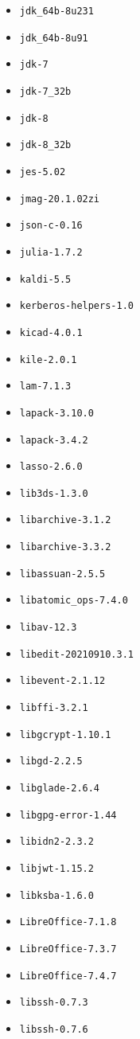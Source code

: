 \begin{itemize}
\item \verb|jdk_64b-8u231|
\item \verb|jdk_64b-8u91|
\item \verb|jdk-7|
\item \verb|jdk-7_32b|
\item \verb|jdk-8|
\item \verb|jdk-8_32b|
\item \verb|jes-5.02|
\item \verb|jmag-20.1.02zi|
\item \verb|json-c-0.16|
\item \verb|julia-1.7.2|
\item \verb|kaldi-5.5|
\item \verb|kerberos-helpers-1.0|
\item \verb|kicad-4.0.1|
\item \verb|kile-2.0.1|
\item \verb|lam-7.1.3|
\item \verb|lapack-3.10.0|
\item \verb|lapack-3.4.2|
\item \verb|lasso-2.6.0|
\item \verb|lib3ds-1.3.0|
\item \verb|libarchive-3.1.2|
\item \verb|libarchive-3.3.2|
\item \verb|libassuan-2.5.5|
\item \verb|libatomic_ops-7.4.0|
\item \verb|libav-12.3|
\item \verb|libedit-20210910.3.1|
\item \verb|libevent-2.1.12|
\item \verb|libffi-3.2.1|
\item \verb|libgcrypt-1.10.1|
\item \verb|libgd-2.2.5|
\item \verb|libglade-2.6.4|
\item \verb|libgpg-error-1.44|
\item \verb|libidn2-2.3.2|
\item \verb|libjwt-1.15.2|
\item \verb|libksba-1.6.0|
\item \verb|LibreOffice-7.1.8|
\item \verb|LibreOffice-7.3.7|
\item \verb|LibreOffice-7.4.7|
\item \verb|libssh-0.7.3|
\item \verb|libssh-0.7.6|

\end{itemize}
